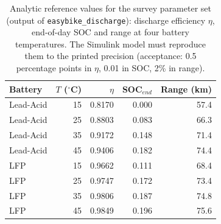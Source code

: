 \begin{table}[t]
\caption{Analytic reference values for the survey parameter set (output of \texttt{easybike\_discharge}): discharge efficiency $\eta$, end-of-day SOC and range at four battery temperatures. The Simulink model must reproduce them to the printed precision (acceptance: 0.5 percentage points in $\eta$, 0.01 in SOC, 2\% in range).}
\label{tab:sim}
\centering\footnotesize
\begin{tabular}{lrrrr}
\hline
Battery & $T$ ($^\circ$C) & $\eta$ & SOC$_{end}$ & Range (km) \\
\hline
Lead-Acid & 15 & 0.8170 & 0.000 & 57.4 \\
Lead-Acid & 25 & 0.8803 & 0.083 & 66.3 \\
Lead-Acid & 35 & 0.9172 & 0.148 & 71.4 \\
Lead-Acid & 45 & 0.9406 & 0.182 & 74.4 \\
LFP & 15 & 0.9662 & 0.111 & 68.4 \\
LFP & 25 & 0.9747 & 0.172 & 73.4 \\
LFP & 35 & 0.9806 & 0.187 & 74.8 \\
LFP & 45 & 0.9849 & 0.196 & 75.6 \\
\hline
\end{tabular}
\end{table}
